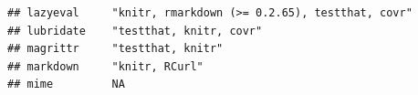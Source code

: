 \documentclass[]{article}
\begin{document}
\begin{verbatim}
## lazyeval     "knitr, rmarkdown (>= 0.2.65), testthat, covr"                                                                                                                                                                                                                                                                                                                                                                                                                                                                                                                                            
## lubridate    "testthat, knitr, covr"                                                                                                                                                                                                                                                                                                                                                                                                                                                                                                                                                                   
## magrittr     "testthat, knitr"                                                                                                                                                                                                                                                                                                                                                                                                                                                                                                                                                                         
## markdown     "knitr, RCurl"                                                                                                                                                                                                                                                                                                                                                                                                                                                                                                                                                                            
## mime         NA                                                                                                                                                                                                                                                                                                                                                                                                                                                                                                                                                                                        

\end{verbatim}
\end{document}
